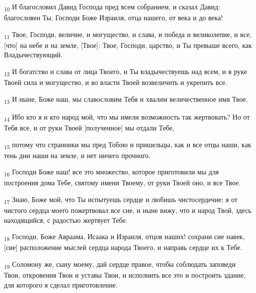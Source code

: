 \begin{tcolorbox}
\textsubscript{10} И благословил Давид Господа пред всем собранием, и сказал Давид: благословен Ты, Господи Боже Израиля, отца нашего, от века и до века!
\end{tcolorbox}
\begin{tcolorbox}
\textsubscript{11} Твое, Господи, величие, и могущество, и слава, и победа и великолепие, и все, [что] на небе и на земле, [Твое]: Твое, Господи, царство, и Ты превыше всего, как Владычествующий.
\end{tcolorbox}
\begin{tcolorbox}
\textsubscript{12} И богатство и слава от лица Твоего, и Ты владычествуешь над всем, и в руке Твоей сила и могущество, и во власти Твоей возвеличить и укрепить все.
\end{tcolorbox}
\begin{tcolorbox}
\textsubscript{13} И ныне, Боже наш, мы славословим Тебя и хвалим величественное имя Твое.
\end{tcolorbox}
\begin{tcolorbox}
\textsubscript{14} Ибо кто я и кто народ мой, что мы имели возможность так жертвовать? Но от Тебя все, и от руки Твоей [полученное] мы отдали Тебе,
\end{tcolorbox}
\begin{tcolorbox}
\textsubscript{15} потому что странники мы пред Тобою и пришельцы, как и все отцы наши, как тень дни наши на земле, и нет ничего прочного.
\end{tcolorbox}
\begin{tcolorbox}
\textsubscript{16} Господи Боже наш! все это множество, которое приготовили мы для построения дома Тебе, святому имени Твоему, от руки Твоей оно, и все Твое.
\end{tcolorbox}
\begin{tcolorbox}
\textsubscript{17} Знаю, Боже мой, что Ты испытуешь сердце и любишь чистосердечие; я от чистого сердца моего пожертвовал все сие, и ныне вижу, что и народ Твой, здесь находящийся, с радостью жертвует Тебе.
\end{tcolorbox}
\begin{tcolorbox}
\textsubscript{18} Господи, Боже Авраама, Исаака и Израиля, отцов наших! сохрани сие навек, [сие] расположение мыслей сердца народа Твоего, и направь сердце их к Тебе.
\end{tcolorbox}
\begin{tcolorbox}
\textsubscript{19} Соломону же, сыну моему, дай сердце правое, чтобы соблюдать заповеди Твои, откровения Твои и уставы Твои, и исполнить все это и построить здание, для которого я сделал приготовление.
\end{tcolorbox}
